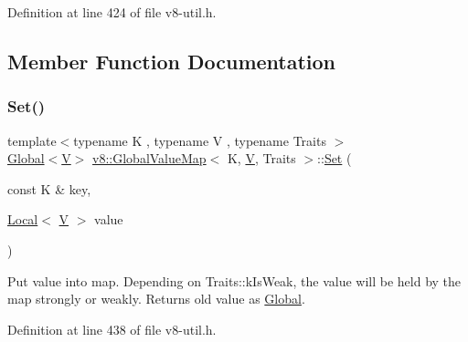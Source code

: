 Definition at line 424 of file v8-\/util.\+h.



\subsection{Member Function Documentation}
\mbox{\label{classv8_1_1GlobalValueMap_aa13f7914642c705b8e96824747ea115a}} 
\subsubsection{\texorpdfstring{Set()}{Set()}\hspace{0.1cm}{\footnotesize\ttfamily [1/3]}}
{\footnotesize\ttfamily template$<$typename K , typename V , typename Traits $>$ \\
\mbox{\hyperlink{classv8_1_1Global}{Global}}$<$\mbox{\hyperlink{classV}{V}}$>$ \mbox{\hyperlink{classv8_1_1GlobalValueMap}{v8\+::\+Global\+Value\+Map}}$<$ K, \mbox{\hyperlink{classV}{V}}, Traits $>$\+::\mbox{\hyperlink{classv8_1_1Set}{Set}} (\begin{DoxyParamCaption}\item[{const K \&}]{key,  }\item[{\mbox{\hyperlink{classv8_1_1Local}{Local}}$<$ \mbox{\hyperlink{classV}{V}} $>$}]{value }\end{DoxyParamCaption})\hspace{0.3cm}{\ttfamily [inline]}}

Put value into map. Depending on Traits\+::k\+Is\+Weak, the value will be held by the map strongly or weakly. Returns old value as \mbox{\hyperlink{classv8_1_1Global}{Global}}. 

Definition at line 438 of file v8-\/util.\+h.

\mbox{\label{classv8_1_1GlobalValueMap_ac2b02a0105393e6e3ab7e0aeeed9a294}} 
